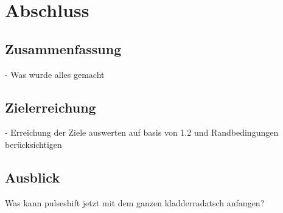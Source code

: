 \chapter{Abschluss}

\section{Zusammenfassung}

- Was wurde alles gemacht

\section{Zielerreichung}

- Erreichung der Ziele auswerten auf basis von 1.2 und Randbedingungen berücksichtigen

\section{Ausblick}

Was kann pulseshift jetzt mit dem ganzen kladderradatsch anfangen?